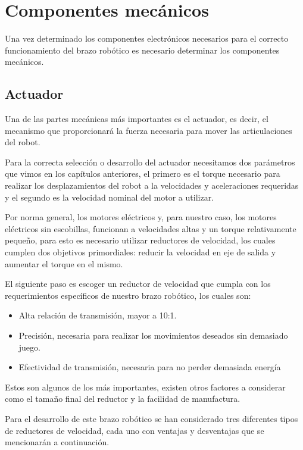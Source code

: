 \chapter{Componentes mecánicos}

Una vez determinado los componentes electrónicos necesarios para el correcto funcionamiento del brazo robótico es necesario determinar los componentes mecánicos.

\section{Actuador}

Una de las partes mecánicas más importantes es el actuador, es decir, el mecanismo que proporcionará la fuerza necesaria para mover las articulaciones del robot.

Para la correcta selección o desarrollo del actuador necesitamos dos parámetros que vimos en los capítulos anteriores, el primero es el torque necesario para realizar los desplazamientos del robot a la velocidades y aceleraciones requeridas y el segundo es la velocidad nominal del motor a utilizar.

Por norma general, los motores eléctricos y, para nuestro caso, los motores eléctricos sin escobillas, funcionan a velocidades altas y un torque relativamente pequeño, para esto es necesario utilizar reductores de velocidad, los cuales cumplen dos objetivos primordiales: reducir la velocidad en eje de salida y aumentar el torque en el mismo.

El siguiente paso es escoger un reductor de velocidad que cumpla con los requerimientos específicos de nuestro brazo robótico, los cuales son:

\begin{itemize}
\item Alta relación de transmisión, mayor a 10:1.
\item Precisión, necesaria para realizar los movimientos deseados sin demasiado juego. 
\item Efectividad de transmisión, necesaria para no perder demasiada energía
\end{itemize}

Estos son algunos de los más importantes, existen otros factores a considerar como el tamaño final del reductor y la facilidad de manufactura.

Para el desarrollo de este brazo robótico se han considerado tres diferentes tipos de reductores de velocidad, cada uno con ventajas y desventajas que se mencionarán a continuación.

